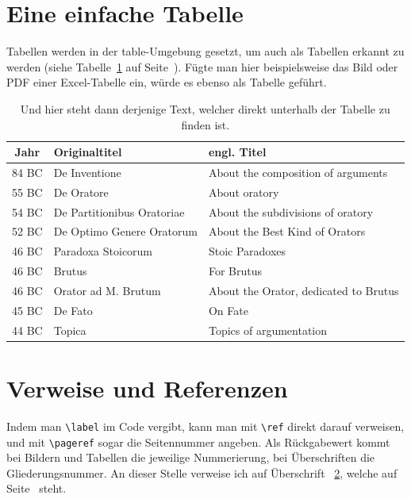 \section{Eine einfache Tabelle}

Tabellen werden in der table-Umgebung gesetzt, um auch als Tabellen erkannt zu werden (siehe Tabelle~\ref{tab:WerkCicero} auf Seite~\pageref{tab:WerkCicero}). Fügte man hier beispielsweise das Bild oder PDF einer Excel-Tabelle ein, würde es ebenso  als Tabelle geführt. 

\begin{table}[!t]
	\centering
	\begin{tabular}{cll}\hline\hline
	Jahr & Originaltitel & engl. Titel \\ \hline
	84 BC & De Inventione & About the composition of arguments \\
	55 BC & De Oratore & About oratory \\
	54 BC & De Partitionibus Oratoriae & About the subdivisions of oratory \\
	52 BC & De Optimo Genere Oratorum & About the Best Kind of Orators \\
	46 BC & Paradoxa Stoicorum & Stoic Paradoxes \\
	46 BC & Brutus & For Brutus \\
	46 BC & Orator ad M. Brutum & About the Orator, dedicated to Brutus \\
	45 BC & De Fato & On Fate \\
	44 BC & Topica & Topics of argumentation \\ \hline\hline
	\end{tabular}
	\caption[Dies ist der Kurztitel fürs Verzeichnis]{Und hier steht dann derjenige Text, welcher direkt unterhalb der Tabelle zu finden ist.}
	\label{tab:WerkCicero} 	%
\end{table}






\section{Verweise und Referenzen}
\label{sec:references}
Indem man \verb+\label+ im Code vergibt, kann man mit \verb+\ref+ direkt darauf verweisen, und mit \verb+\pageref+ sogar die Seitennummer angeben. Als Rückgabewert kommt bei Bildern und Tabellen die jeweilige Nummerierung, bei Überschriften die Gliederungsnummer. An dieser Stelle verweise ich auf Überschrift~ \ref{sec:references}, welche auf Seite~ \pageref{sec:references} steht.

